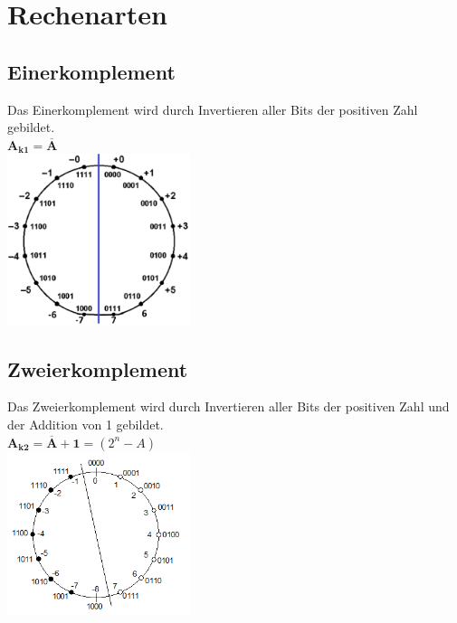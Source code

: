 \section{Rechenarten}
	\begin{multicols}{2}
		\subsection{Einerkomplement}
			Das Einerkomplement wird durch Invertieren aller Bits der positiven Zahl gebildet.\\
			$\mathbf{A_{k1}=\overline{A}}$\\
			\includegraphics[width=0.4\textwidth]{pics/zahlensysteme/einerkomplement.png}	
			\columnbreak
			
		\subsection{Zweierkomplement}
			Das Zweierkomplement wird durch Invertieren aller Bits der positiven Zahl und der Addition von 1 gebildet.\\
			$\mathbf{A_{k2}=\overline{A}+1}=(2^n-A)$\\
			\includegraphics[width=0.4\textwidth]{pics/zahlensysteme/zweierkomplement.png}
	\end{multicols}

